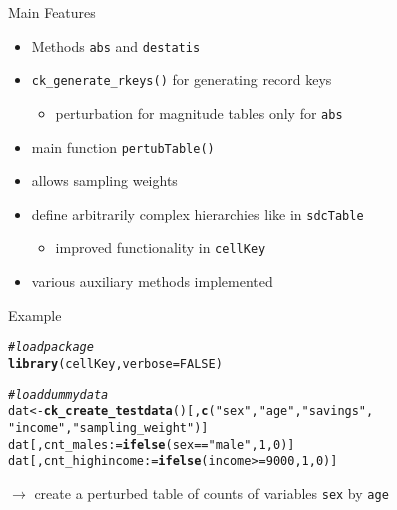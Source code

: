 \documentclass{beamer}\usepackage[]{graphicx}\usepackage[]{color}
\makeatletter
\newcommand{\hlnum}[1]{\textcolor[rgb]{0.686,0.059,0.569}{#1}}%
\newcommand{\hlstr}[1]{\textcolor[rgb]{0.192,0.494,0.8}{#1}}%
\newcommand{\hlcom}[1]{\textcolor[rgb]{0.678,0.584,0.686}{\textit{#1}}}%
\newcommand{\hlopt}[1]{\textcolor[rgb]{0,0,0}{#1}}%
\newcommand{\hlstd}[1]{\textcolor[rgb]{0.345,0.345,0.345}{#1}}%
\newcommand{\hlkwb}[1]{\textcolor[rgb]{0.69,0.353,0.396}{#1}}%
\newcommand{\hlkwc}[1]{\textcolor[rgb]{0.333,0.667,0.333}{#1}}%
\newcommand{\hlkwd}[1]{\textcolor[rgb]{0.737,0.353,0.396}{\textbf{#1}}}%
\newenvironment{kframe}{%
 \def\at@end@of@kframe{}%
 \ifinner\ifhmode%
  \def\at@end@of@kframe{\end{minipage}}%
  \begin{minipage}{\columnwidth}%
 \fi\fi%
 \def\FrameCommand##1{\hskip\@totalleftmargin \hskip-\fboxsep
 \colorbox{shadecolor}{##1}\hskip-\fboxsep
     \hskip-\linewidth \hskip-\@totalleftmargin \hskip\columnwidth}%
 \MakeFramed {\advance\hsize-\width
   \@totalleftmargin\z@ \linewidth\hsize
   \@setminipage}}%
 {\par\unskip\endMakeFramed%
 \at@end@of@kframe}
\newenvironment{knitrout}{}{} %
\makeatother
\begin{document}
\begin{frame}[fragile]{Main Features}
\begin{itemize}
  \item Methods \texttt{abs} and \texttt{destatis}
  \item \texttt{ck\_generate\_rkeys()} for generating record keys
  
  \begin{itemize}
    \item perturbation for magnitude tables only for \texttt{abs} 
  \end{itemize}
  
  \item main function \texttt{pertubTable()}
  \item allows sampling weights
  \item define arbitrarily complex hierarchies like in \texttt{sdcTable}
  
  \begin{itemize}
    \item improved functionality in \texttt{cellKey}
  \end{itemize}
  
  \item various auxiliary methods implemented    
\end{itemize}
\end{frame}

\begin{frame}[fragile]{Example}
\begin{knitrout}\footnotesize
{}\color{fgcolor}\begin{kframe}
\begin{alltt}
\hlcom{# load package}
\hlkwd{library}\hlstd{(cellKey,}\hlkwc{verbose}\hlstd{=}\hlnum{FALSE}\hlstd{)}
\end{alltt}


{\ttfamily\noindent\itshape\color{messagecolor}{\#\# Loading required package: data.table}}\begin{alltt}
\hlcom{# load dummy data}
\hlstd{dat} \hlkwb{<-} \hlkwd{ck_create_testdata}\hlstd{()[,}\hlkwd{c}\hlstd{(}\hlstr{"sex"}\hlstd{,}\hlstr{"age"}\hlstd{,}\hlstr{"savings"}\hlstd{,}
                               \hlstr{"income"}\hlstd{,}\hlstr{"sampling_weight"}\hlstd{)]}
\hlstd{dat[,cnt_males}\hlkwb{:=}\hlkwd{ifelse}\hlstd{(sex}\hlopt{==}\hlstr{"male"}\hlstd{,} \hlnum{1}\hlstd{,} \hlnum{0}\hlstd{)]}
\hlstd{dat[,cnt_highincome}\hlkwb{:=}\hlkwd{ifelse}\hlstd{(income}\hlopt{>=}\hlnum{9000}\hlstd{,} \hlnum{1}\hlstd{,} \hlnum{0}\hlstd{)]}
\end{alltt}
\end{kframe}
\end{knitrout}
$\rightarrow$ create a perturbed table of counts of variables \texttt{sex} by \texttt{age} 
\end{frame}
\end{document}
